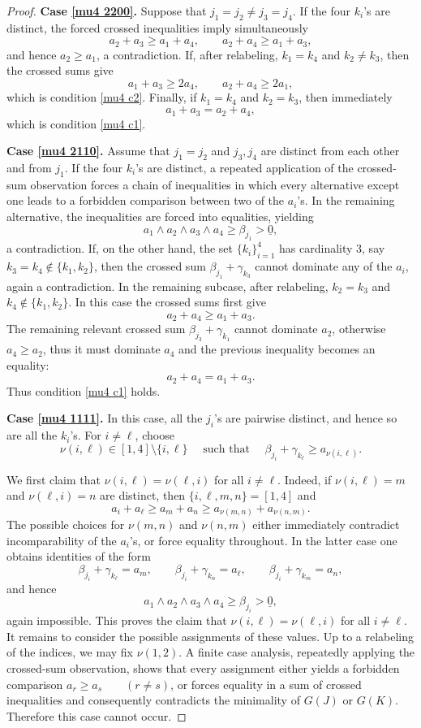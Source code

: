 \documentclass[a4paper,10pt,reqno]{amsart}
\theoremstyle{definition}
\theoremstyle{definition}
\begin{document}
\begin{proof}
\smallskip
\textbf{Case \ref{mu4 2200}.} Suppose that $j_1=j_2\neq j_3=j_4$. If the four $k_i$'s are distinct, the forced crossed inequalities imply simultaneously
\[
a_2+a_3\ge a_1+a_4,\qquad
a_2+a_4\ge a_1+a_3,
\]
and hence $a_2\ge a_1$, a contradiction. If, after relabeling, $k_1=k_4$ and $k_2\neq k_3$, then the crossed sums give
\[
a_1+a_3\ge 2a_4,\qquad a_2+a_4\ge 2a_1,
\]
which is condition \ref{mu4 c2}. Finally, if $k_1=k_4$ and $k_2=k_3$, then immediately
\[
a_1+a_3=a_2+a_4,
\]
which is condition \ref{mu4 c1}.

\smallskip
\textbf{Case \ref{mu4 2110}.} Assume that $j_1=j_2$ and $j_3,j_4$ are distinct from each other and from $j_1$. If the four $k_i$'s are distinct, a repeated application of the crossed-sum observation forces a chain of inequalities in which every alternative except one leads to a forbidden comparison between two of the $a_i$'s. In the remaining alternative, the inequalities are forced into equalities, yielding
\[
a_1\wedge a_2\wedge a_3\wedge a_4\ge \beta_{j_1}>\underline 0,
\]
a contradiction. If, on the other hand, the set $\{k_i\}_{i=1}^4$ has cardinality $3$, say $k_3=k_4\notin\{k_1,k_2\}$, then the crossed sum $\beta_{j_1}+\gamma_{k_3}$ cannot dominate any of the $a_i$, again a contradiction. In the remaining subcase, after relabeling, $k_2=k_3$ and $k_4\notin\{k_1,k_2\}$. In this case the crossed sums first give
\[
a_2+a_4\ge a_1+a_3.
\]
The remaining relevant crossed sum $\beta_{j_3} +\gamma_{k_1}$ cannot dominate $a_2$, otherwise $a_4\ge a_2$, thus it must dominate $a_4$ and the previous inequality becomes an equality:
\[
a_2+a_4=a_1+a_3.
\]
Thus condition \ref{mu4 c1} holds.

\textbf{Case \ref{mu4 1111}.} In this case, all the $j_i$'s are pairwise distinct, and hence so are all the $k_i$'s. For $i\neq \ell$, choose
\[
\nu(i,\ell)\in[1,4]\setminus\{i,\ell\}
\quad \text{ such that }\quad
\beta_{j_i}+\gamma_{k_\ell}\ge a_{\nu(i,\ell)}.
\]

We first claim that $\nu(i,\ell)=\nu(\ell,i)$
for all $i\neq \ell$. Indeed, if $\nu(i,\ell)=m$ and $\nu(\ell,i)=n$ are distinct, then $\{i,\ell,m,n\}=[1,4]$ and
\[
a_i+a_\ell
\ge a_m+a_n
\ge a_{\nu(m,n)}+a_{\nu(n,m)}.
\]
The possible choices for $\nu(m,n)$ and $\nu(n,m)$ either immediately contradict incomparability of the $a_i$'s, or force equality throughout. In the latter case one obtains identities of the form
\[
\beta_{j_i}+\gamma_{k_\ell}=a_m,\qquad
\beta_{j_i}+\gamma_{k_n}=a_\ell,\qquad
\beta_{j_i}+\gamma_{k_m}=a_n,
\]
and hence
\[
a_1\wedge a_2\wedge a_3\wedge a_4\ge \beta_{j_i}>\underline 0,
\]
again impossible. This proves the claim that $\nu(i,\ell)=\nu(\ell,i)$ for all $i\ne\ell$. It remains to consider the possible assignments of these values. Up to a relabeling of the indices, we may fix $\nu(1,2)$. A finite case analysis, repeatedly applying the crossed-sum observation, shows that every assignment either yields a forbidden comparison $a_r\ge a_s\qquad (r\ne s)$, or forces equality in a sum of crossed inequalities and consequently contradicts the minimality of $G(J)$ or $G(K)$. Therefore this case cannot occur. 


\end{proof}
\end{document}

